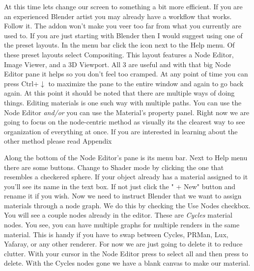 At this time lets change our screen to something a bit more efficient.  If you are an experienced Blender artist you may already have a workflow that works.  Follow it.  The addon won't make you veer too far from what you currently are used to.  If you are just starting with Blender then I would suggest using one of the preset layouts.  In the menu bar click the icon next to the \textsf{Help} menu.  Of these preset layouts select \textsf{Compositing}.  This layout features a \textsf{Node Editor}, \textsf{Image Viewer}, and a \textsf{3D Viewport}.  All 3 are useful and with that big \textsf{Node Editor} pane it helps so you don't feel too cramped.  At any point of time you can press Ctrl+$\downarrow$ to maximize the pane to the entire window and again to go back again.  At this point it should be noted that there are multiple ways of doing things.  Editing materials is one such way with multiple paths.  You can use the \textsf{Node Editor} \emph{and/or} you can use the \textsf{Material}'s property panel.  Right now we are going to focus on the node-centric method as visually its the clearest way to see organization of everything at once.  If you are interested in learning about the other method please read Appendix 

Along the bottom of the \textsf{Node Editor}'s pane is its menu bar.  Next to \textsf{Help} menu there are some buttons.  Change to \textsf{Shader} mode by clicking the one that resembles a checkered sphere.  If your object already has a material assigned to it you'll see its name in the text box.  If not just click the "\textsf{ +    New}" button and rename it if you wish.  Now we need to instruct Blender that we want to assign materials through a node graph.  We do this by checking the \textsf{Use Nodes} checkbox.  You will see a couple nodes already in the editor.  These are \emph{Cycles} material nodes.  You see, you can have multiple graphs for multiple renders in the same material.  This is handy if you have to swap between Cycles, PRMan, Lux, Yafaray, or any other renderer.  For now we are just going to delete it to reduce clutter.  With your cursor in the \textsf{Node Editor} press  to select all and then press  to delete.  With the Cycles nodes gone we have a blank canvas to make our material.

